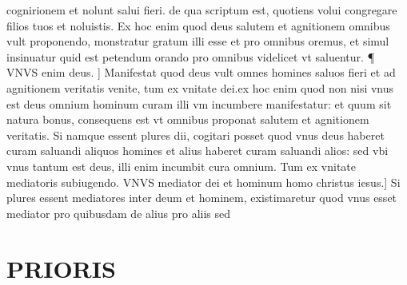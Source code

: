 \documentclass{article}
\begin{document}
\begin{pages}
cognirionem et nolunt salui fieri. de qua scriptum est, quotiens volui congregare filios tuos et noluistis. Ex hoc enim quod deus salutem et agnitionem omnibus vult proponendo, monstratur gratum illi esse et pro omnibus oremus, et simul insinuatur quid est petendum orando pro omnibus videlicet vt saluentur. ¶ VNVS enim deus. ] Manifestat quod deus vult omnes homines saluos fieri et ad agnitionem veritatis venite, tum ex vnitate dei.ex hoc enim quod non nisi vnus est deus omnium hominum curam illi vm incumbere manifestatur: et quum sit natura bonus, consequens est vt omnibus proponat salutem et agnitionem veritatis. Si namque essent plures dii, cogitari posset quod vnus deus haberet curam saluandi aliquos homines et alius haberet curam saluandi alios: sed vbi vnus tantum est deus, illi enim incumbit cura omnium. Tum ex vnitate mediatoris subiugendo. VNVS mediator dei et hominum homo christus iesus.] Si plures essent mediatores inter deum et hominem, existimaretur quod vnus esset mediator pro quibusdam de alius pro aliis sed  \pend
\section*{PRIORIS }

\end{pages}
\end{document}
